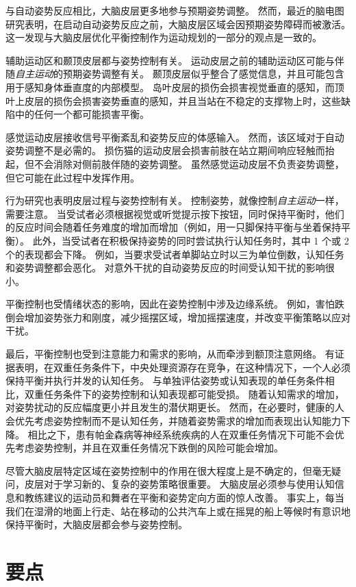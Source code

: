 与自动姿势反应相比，大脑皮层更多地参与预期姿势调整。
然而，最近的脑电图研究表明，在启动自动姿势反应之前，大脑皮层区域会因预期姿势障碍而被激活。
这一发现与大脑皮层优化平衡控制作为运动规划的一部分的观点是一致的。


辅助运动区和颞顶皮层都与姿势控制有关。
运动皮层之前的辅助运动区可能与伴随\textit{自主运动}的预期姿势调整有关。
颞顶皮层似乎整合了感觉信息，并且可能包含用于感知身体垂直度的内部模型。
岛叶皮层的损伤会损害视觉垂直的感知，而顶叶上皮层的损伤会损害姿势垂直的感知，并且当站在不稳定的支撑物上时，这些缺陷中的任何一个都可能损害平衡。


感觉运动皮层接收信号平衡紊乱和姿势反应的体感输入。
然而，该区域对于自动姿势调整不是必需的。
损伤猫的运动皮层会损害前肢在站立期间响应轻触而抬起，但不会消除对侧前肢伴随的姿势调整。
虽然感觉运动皮层不负责姿势调整，但它可能在此过程中发挥作用。


行为研究也表明皮层过程与姿势控制有关。
控制姿势，就像控制\textit{自主运动}一样，需要注意。
当受试者必须根据视觉或听觉提示按下按钮，同时保持平衡时，他们的反应时间会随着任务难度的增加而增加（例如，用一只脚保持平衡与坐着保持平衡）。
此外，当受试者在积极保持姿势的同时尝试执行认知任务时，其中 1 个或 2 个的表现都会下降。
例如，当要求受试者单脚站立时以三为单位倒数，认知任务和姿势调整都会恶化。
对意外干扰的自动姿势反应的时间受认知干扰的影响很小。


平衡控制也受情绪状态的影响，因此在姿势控制中涉及边缘系统。
例如，害怕跌倒会增加姿势张力和刚度，减少摇摆区域，增加摇摆速度，并改变平衡策略以应对干扰。


最后，平衡控制也受到注意能力和需求的影响，从而牵涉到额顶注意网络。
有证据表明，在双重任务条件下，中央处理资源存在竞争，在这种情况下，一个人必须保持平衡并执行并发的认知任务。
与单独评估姿势或认知表现的单任务条件相比，双重任务条件下的姿势控制和认知表现都可能受损。
随着认知需求的增加，对姿势扰动的反应幅度更小并且发生的潜伏期更长。
然而，在必要时，健康的人会优先考虑姿势控制而不是认知任务，并随着姿势需求的增加而表现出认知能力下降。
相比之下，患有帕金森病等神经系统疾病的人在双重任务情况下可能不会优先考虑姿势控制，并且在双重任务情况下跌倒的风险可能会增加。


尽管大脑皮层特定区域在姿势控制中的作用在很大程度上是不确定的，但毫无疑问，皮层对于学习新的、复杂的姿势策略很重要。
大脑皮层必须参与使用认知信息和教练建议的运动员和舞者在平衡和姿势定向方面的惊人改善。
事实上，每当我们在湿滑的地面上行走、站在移动的公共汽车上或在摇晃的船上等候时有意识地保持平衡时，大脑皮层都会参与姿势控制。



\section{要点}

